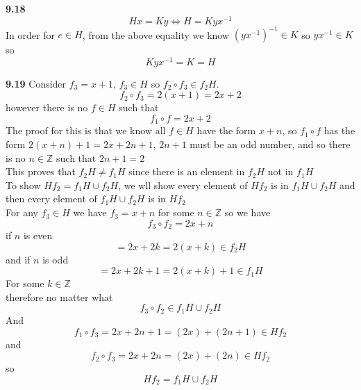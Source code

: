 \documentclass[12pt]{article}
\newenvironment{ques}{\vspace{2 ex}}{\vspace{2 ex}}
\theoremstyle{definition}
\begin{document}
\begin{ques} 
	\textbf{9.18} 
		$$Hx = Ky \Leftrightarrow H = Kyx^{-1}$$
		In order for $e \in H$, from the above equality we know
		$(yx^{-1})^{-1} \in K$ so $yx^{-1} \in K$ so 
		$$Kyx^{-1} = K = H$$
\end{ques}

\begin{ques}
	\textbf{9.19} 
		Consider $f_3 = x + 1$, $f_3 \in H$ so $f_2 \circ f_3 \in f_2H$.\\
		$$f_2 \circ f_3 = 2(x + 1) = 2x + 2$$
		however there is no $f \in H$ such that 
		$$f_1 \circ f = 2x + 2$$
		The proof for this is that we know all $f \in H$ have the form $x + n$, so 
		$f_1 \circ f$ has the form $2(x + n) + 1 = 2x + 2n + 1$, $2n +
		1$ must be an odd number, and so there is no $n \in \mathbb{Z}$
		such that $2n + 1 = 2$\\
		This proves that $f_2H \neq f_1H$ since there is an element in
		$f_2H$ not in $f_1H$\\
		To show $Hf_2 = f_1H \cup f_2H$, we wll show every element of
		$Hf_2$ is in $f_1H \cup f_2H$ and then every element of $f_1H \cup
		f_2H$ is in $Hf_2$\\
		For any $f_3 \in H$ we have $f_3 = x + n$ for some $n \in
		\mathbb{Z}$ so we have 
		$$f_3 \circ f_2 = 2x + n$$
		if $n$ is even
		$$= 2x + 2k = 2(x + k) \in f_2H$$
		and if $n$ is odd
		$$= 2x + 2k + 1 = 2(x + k) + 1 \in f_1H$$
		For some $k \in \mathbb{Z}$\\
		therefore no matter what
		$$f_3 \circ f_2 \in f_1H \cup f_2H$$
		And 
		$$f_1 \circ f_3 = 2x + 2n + 1 = (2x) + (2n + 1) \in Hf_2$$	
		and
		$$f_2 \circ f_3 = 2x + 2n = (2x) + (2n) \in Hf_2$$
		so
		$$Hf_2 = f_1H \cup f_2H$$
\end{ques}
\end{document}
